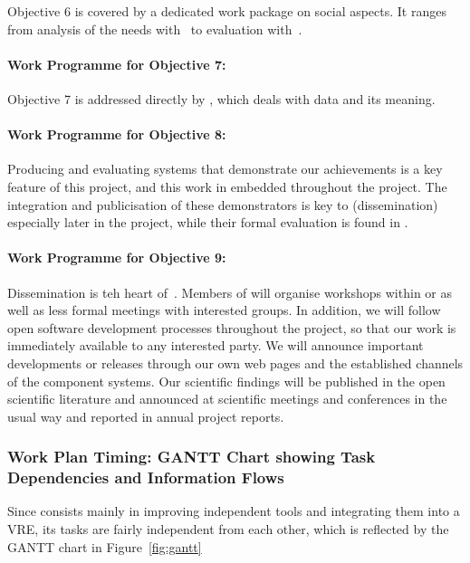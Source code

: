 \documentclass[noworkareas,deliverables,\classoptions]{euproposal}       %
\begin{document}
\begin{proposal}
Objective 6 is covered by a dedicated work package  on social aspects.
It ranges from analysis of the needs with~ to
evaluation with~.

\paragraph{Work Programme for Objective 7: }

Objective 7 is addressed directly by , which deals with data
and its meaning.

\paragraph{Work Programme for Objective 8: }

Producing and evaluating systems that demonstrate our achievements is
a key feature of this project, and this work in embedded throughout
the project. The integration and publicisation of these demonstrators
is key to  (dissemination) especially later in the
project, while their formal evaluation is found in .

\paragraph{Work Programme for Objective 9: }

Dissemination is teh heart of~.
Members of \TheProject will organise workshops within 
or  as well as less formal meetings
with interested groups. In addition, we will follow open software development
processes throughout the project, so that our work is immediately
available to any interested party. We will announce important
developments or releases through our own web pages and the
established channels of the component systems. Our scientific findings
will be published in the open scientific literature and announced at
scientific meetings and conferences in the usual way and reported in
annual project reports.


\subsubsection{Work Plan Timing: GANTT Chart showing Task Dependencies and Information
  Flows}

Since \TheProject consists mainly in improving independent tools and
integrating them into a VRE, its tasks are fairly independent from each
other, which is reflected by the GANTT chart in Figure~\ref{fig:gantt}


\end{proposal}
\end{document}

